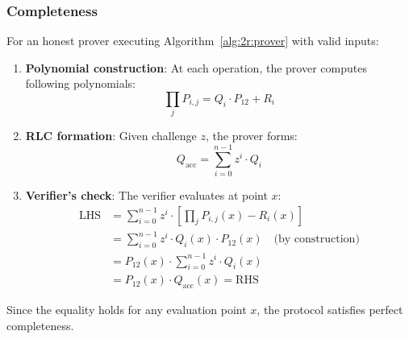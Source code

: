 \subsubsection{Completeness}

For an honest prover executing Algorithm~\ref{alg:2r:prover} with valid inputs:

\begin{enumerate}
\item \textbf{Polynomial construction}: At each operation, the prover computes following polynomials:
   $$\prod_{j} P_{i,j} = Q_i \cdot P_{12} + R_i$$

\item \textbf{RLC formation}: Given challenge $z$, the prover forms:
   $$Q_{\text{acc}} = \sum_{i=0}^{n-1} z^i \cdot Q_i$$

\item \textbf{Verifier's check}: The verifier evaluates at point $x$:
   \begin{align*}
   \text{LHS} &= \sum_{i=0}^{n-1} z^i \cdot \left[\prod_{j} P_{i,j}(x) - R_i(x)\right]\\
   &= \sum_{i=0}^{n-1} z^i \cdot Q_i(x) \cdot P_{12}(x) \quad \text{(by construction)}\\
   &= P_{12}(x) \cdot \sum_{i=0}^{n-1} z^i \cdot Q_i(x)\\
   &= P_{12}(x) \cdot Q_{\text{acc}}(x) = \text{RHS}
   \end{align*}
\end{enumerate}

Since the equality holds for any evaluation point $x$, the protocol satisfies perfect completeness.

